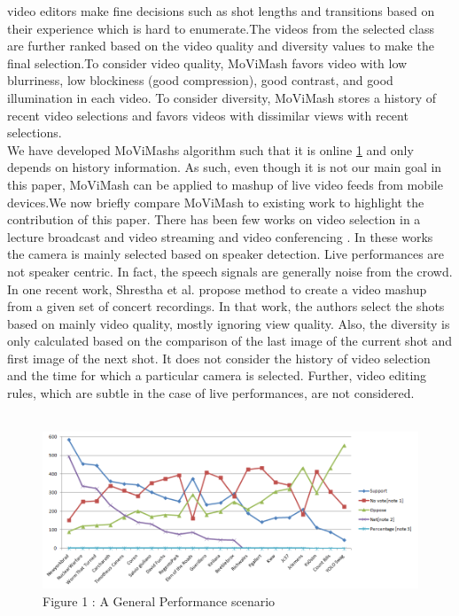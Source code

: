 \documentclass{sig-alternate}
\begin{document}
video editors make fine decisions such as shot lengths and transitions based on their experience which is hard to enumerate.The videos from the selected class are further ranked based on the video quality and diversity values to make the final selection.To consider video quality, MoViMash favors video with low blurriness, low blockiness (good compression), good contrast, and good illumination in each video. To consider diversity, MoViMash stores a history of recent video selections and favors videos with dissimilar views with recent selections.\\
\qquad We have developed MoViMash\textquotesingle s algorithm such that it is online \ref{Fig1}
and only depends on history information. As such, even though it is not our main goal in this paper, MoViMash can be applied to mashup of live video feeds from mobile devices.We now briefly compare MoViMash to existing work to highlight the contribution of this paper. There has been few works on video selection in a lecture broadcast and video streaming and video conferencing \cite{web:3}. In these works the camera is mainly selected based on speaker detection. Live performances are not speaker centric. In fact, the speech signals are generally noise from the crowd. In one recent work, Shrestha et al. \cite{web:15} propose method to create a video mashup from a given set of concert recordings. In that work, the authors select the shots based on mainly video quality, mostly ignoring view quality. Also, the diversity is only calculated based on the comparison of the last image of the current shot and first image of the next shot. It does not consider the history of video selection and the time for which a particular camera is selected. Further, video editing rules, which are subtle in the case of live performances, are not considered.\\\\
\begin{figure}
  \includegraphics[width=\linewidth]{Graph_1.png}
  \caption{Figure 1 : A General Performance scenario}
  \label{Fig1}
\end{figure}
\end{document}
